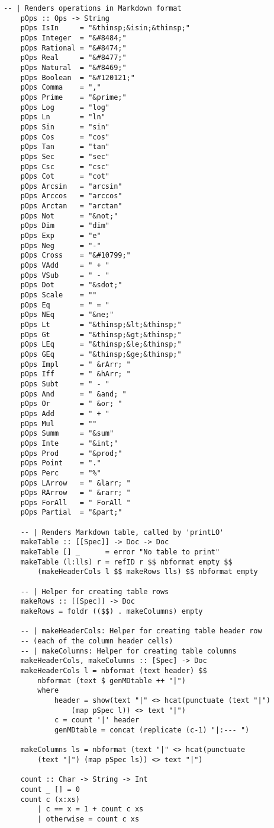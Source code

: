 \begin{lstlisting}[language=haskell1, 
	basicstyle=\linespread{1.1}\small\ttfamily]
	-- | Renders operations in Markdown format
	pOps :: Ops -> String
	pOps IsIn     = "&thinsp;&isin;&thinsp;"
	pOps Integer  = "&#8484;"
	pOps Rational = "&#8474;"
	pOps Real     = "&#8477;"
	pOps Natural  = "&#8469;"
	pOps Boolean  = "&#120121;"
	pOps Comma    = ","
	pOps Prime    = "&prime;"
	pOps Log      = "log"
	pOps Ln       = "ln"
	pOps Sin      = "sin"
	pOps Cos      = "cos"
	pOps Tan      = "tan"
	pOps Sec      = "sec"
	pOps Csc      = "csc"
	pOps Cot      = "cot"
	pOps Arcsin   = "arcsin"
	pOps Arccos   = "arccos"
	pOps Arctan   = "arctan"
	pOps Not      = "&not;"
	pOps Dim      = "dim"
	pOps Exp      = "e"
	pOps Neg      = "-"
	pOps Cross    = "&#10799;"
	pOps VAdd     = " + "
	pOps VSub     = " - "
	pOps Dot      = "&sdot;"
	pOps Scale    = ""
	pOps Eq       = " = "
	pOps NEq      = "&ne;"
	pOps Lt       = "&thinsp;&lt;&thinsp;" 
	pOps Gt       = "&thinsp;&gt;&thinsp;"
	pOps LEq      = "&thinsp;&le;&thinsp;"
	pOps GEq      = "&thinsp;&ge;&thinsp;"
	pOps Impl     = " &rArr; "
	pOps Iff      = " &hArr; "
	pOps Subt     = " - "
	pOps And      = " &and; "
	pOps Or       = " &or; "
	pOps Add      = " + "
	pOps Mul      = ""
	pOps Summ     = "&sum"
	pOps Inte     = "&int;"
	pOps Prod     = "&prod;"
	pOps Point    = "."
	pOps Perc     = "%"
	pOps LArrow   = " &larr; "
	pOps RArrow   = " &rarr; "
	pOps ForAll   = " ForAll "
	pOps Partial  = "&part;"
	
	-- | Renders Markdown table, called by 'printLO'
	makeTable :: [[Spec]] -> Doc -> Doc
	makeTable [] _      = error "No table to print"
	makeTable (l:lls) r = refID r $$ nbformat empty $$ 
		(makeHeaderCols l $$ makeRows lls) $$ nbformat empty
	
	-- | Helper for creating table rows
	makeRows :: [[Spec]] -> Doc
	makeRows = foldr (($$) . makeColumns) empty
	
	-- | makeHeaderCols: Helper for creating table header row 
	-- (each of the column header cells)
	-- | makeColumns: Helper for creating table columns
	makeHeaderCols, makeColumns :: [Spec] -> Doc
	makeHeaderCols l = nbformat (text header) $$ 
		nbformat (text $ genMDtable ++ "|")
		where 
			header = show(text "|" <> hcat(punctuate (text "|") 
				(map pSpec l)) <> text "|")        
			c = count '|' header
			genMDtable = concat (replicate (c-1) "|:--- ")
	
	makeColumns ls = nbformat (text "|" <> hcat(punctuate 
		(text "|") (map pSpec ls)) <> text "|")
	
	count :: Char -> String -> Int
	count _ [] = 0
	count c (x:xs) 
		| c == x = 1 + count c xs
		| otherwise = count c xs
	

\end{lstlisting}
